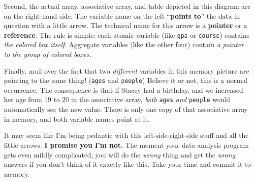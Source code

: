 
Second, the actual array, associative array, and table depicted in this diagram
are on the right-hand side. The variable name on the left ``\textbf{points
to}'' the data in question with a little arrow. The technical name for this
arrow is a \textbf{pointer} or a \textbf{reference}. The rule is simple: each
atomic variable (like \texttt{gpa} or \texttt{course}) contains \textit{the
colored box itself}. Aggregate variables (like the other four) contain
\textit{a pointer to the group of colored boxes.}

Finally, mull over the fact that two \textit{different} variables in this
memory picture are pointing to the same thing! (\texttt{ages} and
\texttt{people}) Believe it or not, this is a normal occurrence. The
consequence is that if Stacey had a birthday, and we increased her age from 19
to 20 in the associative array, \textit{both} \texttt{ages} \textit{and}
\texttt{people} would automatically see the new value. There is only one copy
of that associative array in memory, and both variable names point at it.

It may seem like I'm being pedantic with this left-side-right-side stuff and
all the little arrows. \textbf{I promise you I'm not.} The moment your data
analysis program gets even mildly complicated, you will do the \textit{wrong}
thing and get the \textit{wrong} answers if you don't think of it exactly like
this. Take your time and commit it to memory.
